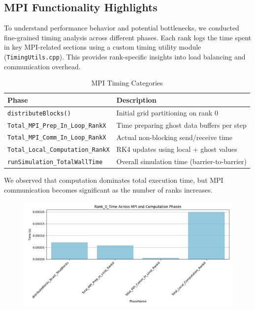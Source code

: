 \subsection{MPI Functionality Highlights}
To understand performance behavior and potential bottlenecks, we conducted fine-grained timing analysis across different phases. Each rank logs the time spent in key MPI-related sections using a custom timing utility module\\ (\texttt{TimingUtils.cpp}). This provides rank-specific insights into load balancing and communication overhead.

\begin{table}[h]
\centering
\begin{tabular}{|l|p{9cm}|}
\hline
\textbf{Phase} & \textbf{Description} \\
\hline
\texttt{distributeBlocks()} & Initial grid partitioning on rank 0 \\
\texttt{Total\_MPI\_Prep\_In\_Loop\_RankX} & Time preparing ghost data buffers per step \\
\texttt{Total\_MPI\_Comm\_In\_Loop\_RankX} & Actual non-blocking send/receive time \\
\texttt{Total\_Local\_Computation\_RankX} & RK4 updates using local + ghost values \\
\texttt{runSimulation\_TotalWallTime} & Overall simulation time (barrier-to-barrier) \\
\hline
\end{tabular}
\caption{MPI Timing Categories}
\end{table}

We observed that computation dominates total execution time, but MPI communication becomes significant as the number of ranks increases.
\begin{figure}[!htb]
    \centering
    \includegraphics[width=14cm]{Images/pic1.png}
\end{figure}


